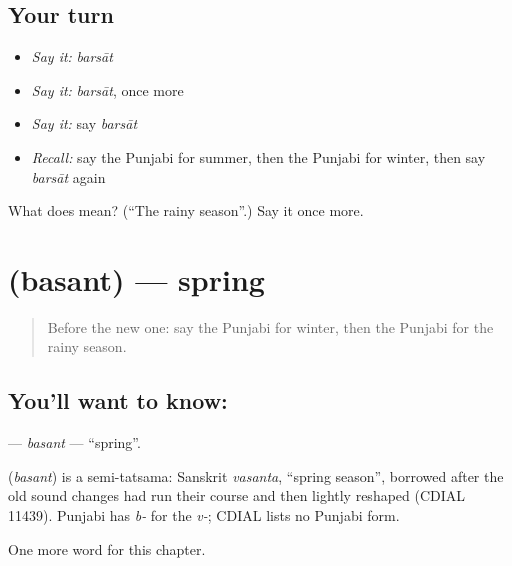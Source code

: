 \subsection*{Your turn}
\begin{itemize}
\raggedright
  \item \emph{Say it:} \emph{barsāt}
  \item \emph{Say it:} \emph{barsāt}, once more
  \item \emph{Say it:} say \emph{barsāt}
  \item \emph{Recall:} say the Punjabi for summer, then the Punjabi for winter, then say \emph{barsāt} again
\end{itemize}

\begin{tcolorbox}[breakable,colback=teal!4,colframe=teal!35!black,title={Before you move on}]
What does  mean? (\textquotedblleft{}The rainy season\textquotedblright{}.) Say it once more.
\end{tcolorbox}
\section[\texorpdfstring{\pa{ਬਸੰਤ} (basant)}{ਬਸੰਤ (basant)}]{ (basant) — spring}

\label{lesson:PA-C100-basant}



\begin{quote}
Before the new one: say the Punjabi for winter, then the Punjabi for the rainy season.
\end{quote}

\subsection*{You'll want to know: }
\textbf{} — \emph{basant} — \textquotedblleft{}spring\textquotedblright{}.

\begin{cousinweb}
\textbf{} (\emph{basant}) is a semi-tatsama: Sanskrit \emph{vasanta}, \textquotedblleft{}spring season\textquotedblright{}, borrowed after the old sound changes had run their course and then lightly reshaped (CDIAL 11439). Punjabi has \emph{b-} for the \emph{v-}; CDIAL lists no Punjabi form.
\end{cousinweb}

\begin{grammarlens}[title={What you've built}]
One more word for this chapter.
\end{grammarlens}

